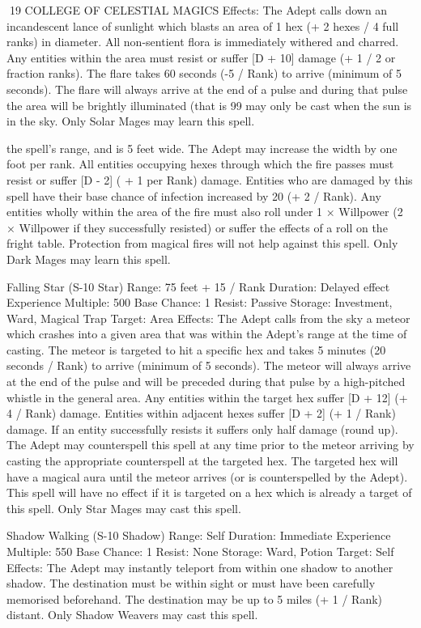 \documentclass[a4paper]{article}
\begin{document}
\begin{multicols}{3}
19 COLLEGE OF CELESTIAL MAGICS
Effects: The Adept calls down an incandescent
lance of sunlight which blasts an area of 1 hex (+ 2
hexes / 4 full ranks) in diameter. All non-sentient
flora is immediately withered and charred. Any
entities within the area must resist or suffer [D +
10] damage (+ 1 / 2 or fraction ranks). The flare
takes 60 seconds (-5 / Rank) to arrive (minimum of
5 seconds). The flare will always arrive at the end
of a pulse and during that pulse the area will be
brightly illuminated (that is 99%
may only be cast when the sun is in the sky. Only
Solar Mages may learn this spell.

the spell’s range, and is 5 feet wide. The Adept
may increase the width by one foot per rank. All
entities occupying hexes through which the fire
passes must resist or suffer [D - 2] ( + 1 per Rank)
damage. Entities who are damaged by this spell
have their base chance of infection increased by 20
(+ 2 / Rank). Any entities wholly within the area of
the fire must also roll under 1 × Willpower (2 ×
Willpower if they successfully resisted) or suffer
the effects of a roll on the fright table. Protection
from magical fires will not help against this spell.
Only Dark Mages may learn this spell.

Falling Star (S-10 Star)
Range: 75 feet + 15 / Rank
Duration: Delayed effect
Experience Multiple: 500
Base Chance: 1%
Resist: Passive
Storage: Investment, Ward, Magical Trap
Target: Area
Effects: The Adept calls from the sky a meteor
which crashes into a given area that was within the
Adept’s range at the time of casting. The meteor is
targeted to hit a specific hex and takes 5 minutes
(20 seconds / Rank) to arrive (minimum of 5 seconds). The meteor will always arrive at the end of
the pulse and will be preceded during that pulse by
a high-pitched whistle in the general area. Any
entities within the target hex suffer [D + 12] (+ 4 /
Rank) damage. Entities within adjacent hexes
suffer [D + 2] (+ 1 / Rank) damage. If an entity
successfully resists it suffers only half damage
(round up). The Adept may counterspell this spell
at any time prior to the meteor arriving by casting
the appropriate counterspell at the targeted hex.
The targeted hex will have a magical aura until the
meteor arrives (or is counterspelled by the Adept).
This spell will have no effect if it is targeted on a
hex which is already a target of this spell. Only
Star Mages may cast this spell.

Shadow Walking (S-10 Shadow)
Range: Self
Duration: Immediate
Experience Multiple: 550
Base Chance: 1%
Resist: None
Storage: Ward, Potion
Target: Self
Effects: The Adept may instantly teleport from
within one shadow to another shadow. The destination must be within sight or must have been carefully memorised beforehand. The destination may
be up to 5 miles (+ 1 / Rank) distant. Only Shadow
Weavers may cast this spell.


\end{multicols}
\end{document}

